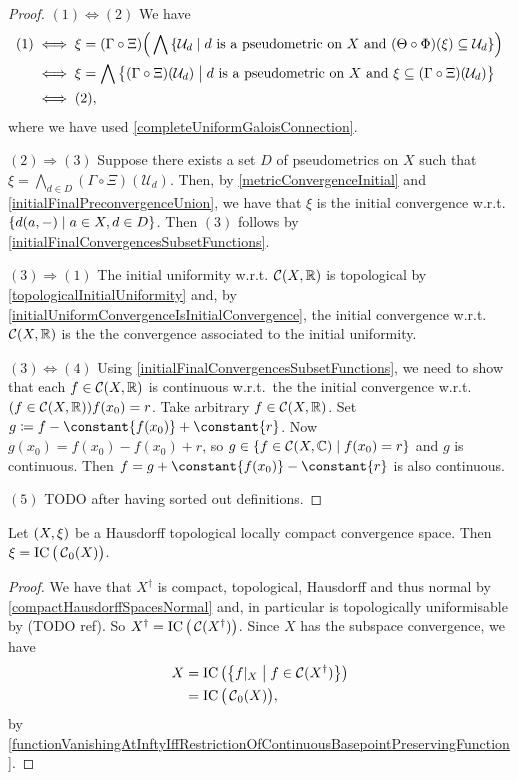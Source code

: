 \begin{proof}
$(1) \Leftrightarrow (2)$  We have
\begin{align*}
(1) &\iff \xi = (\Gamma \circ \Xi)\Big(\bigwedge \setbuilder{\mathcal{U}_d}{\text{$d$ is a pseudometric on $X$ and $(\Theta\circ \Phi)(\xi)\subseteq \mathcal{U}_d$}}\Big) \\
&\iff \xi = \bigwedge\setbuilder[\big]{(\Gamma \circ \Xi)(\mathcal{U}_d)}{\text{$d$ is a pseudometric on $X$ and $\xi\subseteq (\Gamma\circ \Xi)(\mathcal{U}_d)$}} \\
&\iff (2),
\end{align*}
where we have used \ref{completeUniformGaloisConnection}.

$(2) \Rightarrow (3)$ Suppose there exists a set $D$ of pseudometrics on $X$ such that $\xi = \bigwedge_{d\in D}(\Gamma\circ \Xi)(\mathcal{U}_d)$. Then, by \ref{metricConvergenceInitial} and \ref{initialFinalPreconvergenceUnion}, we have that $\xi$ is the initial convergence w.r.t.  $\setbuilder{d(a,-)}{a\in X, d\in D}$. Then $(3)$ follows by \ref{initialFinalConvergencesSubsetFunctions}. 

$(3) \Rightarrow (1)$ The initial uniformity w.r.t. $\operatorname{\mathcal{C}}(X,\mathbb{R})$ is topological by \ref{topologicalInitialUniformity} and, by \ref{initialUniformConvergenceIsInitialConvergence}, the initial convergence w.r.t. $\operatorname{\mathcal{C}}(X,\mathbb{R})$ is the the convergence associated to the initial uniformity.

$(3) \Leftrightarrow (4)$ Using \ref{initialFinalConvergencesSubsetFunctions}, we need to show that each $f\in \operatorname{\mathcal{C}}(X,\mathbb{R})$ is continuous w.r.t.\ the the initial convergence w.r.t. $\sSet{f \in \cont(X,\R)}{f(x_0) = r}$. Take arbitrary $f\in \operatorname{\mathcal{C}}(X, \mathbb{R})$. Set $g \defeq f - \constant{f(x_0)}+\constant{r}$. Now $g(x_0) = f(x_0) - f(x_0) + r$, so $g\in \setbuilder{f\in \cont(X,\C)}{f(x_0) = r}$ and $g$ is continuous. Then $f = g + \constant{f(x_0)}-\constant{r}$ is also continuous.

$(5)$ TODO after having sorted out definitions.
\end{proof}

\begin{lemma} \label{LCTopologicalHausdorffInitialConvergence}
Let $\sSet{X,\xi}$ be a Hausdorff topological locally compact convergence space. Then $\xi = \operatorname{IC}\big(\operatorname{\mathcal{C}}_0(X)\big)$.
\end{lemma}
\begin{proof}
We have that $X^\dagger$ is compact, topological, Hausdorff and thus normal by \ref{compactHausdorffSpacesNormal} and, in particular is topologically uniformisable by (TODO ref). So $X^\dagger = \operatorname{IC}\big(\operatorname{\mathcal{C}}(X^\dagger)\big)$. Since $X$ has the subspace convergence, we have
\begin{align*}
X &= \initialConv\big(\setbuilder{f|_X}{f\in \cont(X^\dagger)}\big) \\
&= \initialConv\big(\cont_0(X)\big),
\end{align*}
by \ref{functionVanishingAtInftyIffRestrictionOfContinuousBasepointPreservingFunction}.
\end{proof}


